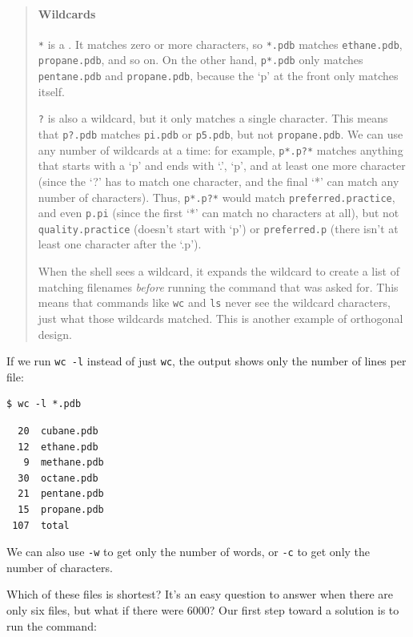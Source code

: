 \documentclass{book}
\begin{document}
\begin{quote}
\mbox{}\paragraph{Wildcards}

\texttt{*} is a . It matches zero or more
characters, so \texttt{*.pdb} matches \texttt{ethane.pdb},
\texttt{propane.pdb}, and so on. On the other hand, \texttt{p*.pdb} only
matches \texttt{pentane.pdb} and \texttt{propane.pdb}, because the `p'
at the front only matches itself.

\texttt{?} is also a wildcard, but it only matches a single character.
This means that \texttt{p?.pdb} matches \texttt{pi.pdb} or
\texttt{p5.pdb}, but not \texttt{propane.pdb}. We can use any number of
wildcards at a time: for example, \texttt{p*.p?*} matches anything that
starts with a `p' and ends with `.', `p', and at least one more
character (since the `?' has to match one character, and the final `*'
can match any number of characters). Thus, \texttt{p*.p?*} would match
\texttt{preferred.practice}, and even \texttt{p.pi} (since the first `*'
can match no characters at all), but not \texttt{quality.practice}
(doesn't start with `p') or \texttt{preferred.p} (there isn't at least
one character after the `.p').

When the shell sees a wildcard, it expands the wildcard to create a list
of matching filenames \emph{before} running the command that was asked
for. This means that commands like \texttt{wc} and \texttt{ls} never see
the wildcard characters, just what those wildcards matched. This is
another example of orthogonal design.
\end{quote}

If we run \texttt{wc -l} instead of just \texttt{wc}, the output shows
only the number of lines per file:

\begin{verbatim}
$ wc -l *.pdb
\end{verbatim}

\begin{verbatim}
  20  cubane.pdb
  12  ethane.pdb
   9  methane.pdb
  30  octane.pdb
  21  pentane.pdb
  15  propane.pdb
 107  total
\end{verbatim}

We can also use \texttt{-w} to get only the number of words, or
\texttt{-c} to get only the number of characters.

Which of these files is shortest? It's an easy question to answer when
there are only six files, but what if there were 6000? Our first step
toward a solution is to run the command:
\end{document}
